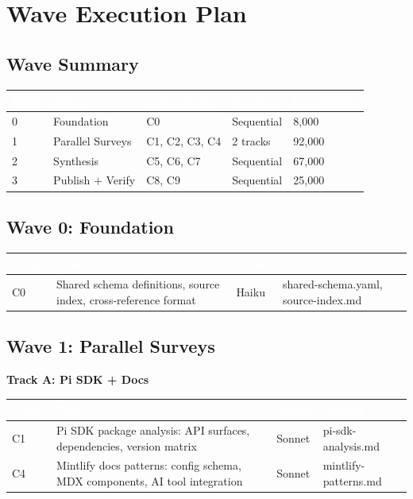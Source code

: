 \documentclass[11pt,letterpaper]{article}
\newcommand{\tableheader}[1]{\textbf{\sffamily\textcolor{white}{#1}}}
\begin{document}
\section{Wave Execution Plan}

\subsection{Wave Summary}

\begin{center}
\begin{tabularx}{\textwidth}{C{1.5cm}L{3cm}C{2cm}C{2cm}C{2cm}}
\toprule
{}
\tableheader{Wave} & \tableheader{Name} & \tableheader{Components} & \tableheader{Parallel} & \tableheader{Est. Tokens} \\
 & Foundation & C0 & Sequential & 8,000 \\
1 & Parallel Surveys & C1, C2, C3, C4 & 2 tracks & 92,000 \\
2 & Synthesis & C5, C6, C7 & Sequential & 67,000 \\
3 & Publish + Verify & C8, C9 & Sequential & 25,000 \\
\bottomrule
\end{tabularx}
\end{center}

\subsection{Wave 0: Foundation}

\begin{center}
\begin{tabularx}{\textwidth}{C{0.8cm}L{3cm}C{1.5cm}X}
\toprule
{}
\tableheader{Comp} & \tableheader{Task} & \tableheader{Model} & \tableheader{Output} \\
\midrule
C0 & Shared schema definitions, source index, cross-reference format & Haiku & shared-schema.yaml, source-index.md \\
\bottomrule
\end{tabularx}
\end{center}

\subsection{Wave 1: Parallel Surveys}

\textbf{Track A: Pi SDK + Docs}

\begin{center}
\begin{tabularx}{\textwidth}{C{0.8cm}L{3cm}C{1.5cm}X}
\toprule
{}
\tableheader{Comp} & \tableheader{Task} & \tableheader{Model} & \tableheader{Output} \\
\midrule
C1 & Pi SDK package analysis: API surfaces, dependencies, version matrix & Sonnet & pi-sdk-analysis.md \\
C4 & Mintlify docs patterns: config schema, MDX components, AI tool integration & Sonnet & mintlify-patterns.md \\
\bottomrule
\end{tabularx}
\end{center}
\end{document}
